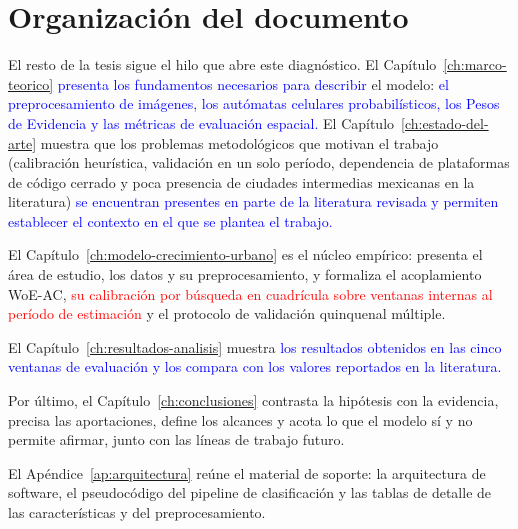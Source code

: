 \section{Organización del documento}

El resto de la tesis sigue el hilo que abre este diagnóstico. El Capítulo~\ref{ch:marco-teorico} \textcolor{blue}{presenta los fundamentos necesarios para describir} el modelo: \textcolor{blue}{el preprocesamiento de imágenes, los autómatas celulares probabilísticos, los Pesos de Evidencia y las métricas de evaluación espacial.} El Capítulo~\ref{ch:estado-del-arte} muestra que los problemas metodológicos que motivan el trabajo (calibración heurística, validación en un solo período, dependencia de plataformas de código cerrado y poca presencia de ciudades intermedias mexicanas en la literatura) \textcolor{blue}{se encuentran presentes en parte de la literatura revisada y permiten establecer el contexto en el que se plantea el trabajo.}

El Capítulo~\ref{ch:modelo-crecimiento-urbano} es el núcleo empírico: presenta el área de estudio, los datos y su preprocesamiento, y formaliza el acoplamiento WoE-AC, \textcolor{red}{su calibración por búsqueda en cuadrícula sobre ventanas internas al período de estimación} y el protocolo de validación quinquenal múltiple.

El Capítulo~\ref{ch:resultados-analisis} muestra \textcolor{blue}{los resultados obtenidos en las cinco ventanas de evaluación y los compara con los valores reportados en la literatura.}

Por último, el Capítulo~\ref{ch:conclusiones} contrasta la hipótesis con la evidencia, precisa las aportaciones, define los alcances y acota lo que el modelo sí y no permite afirmar, junto con las líneas de trabajo futuro.

El Apéndice~\ref{ap:arquitectura} reúne el material de soporte: la arquitectura de software, el pseudocódigo del pipeline de clasificación y las tablas de detalle de las características y del preprocesamiento.

